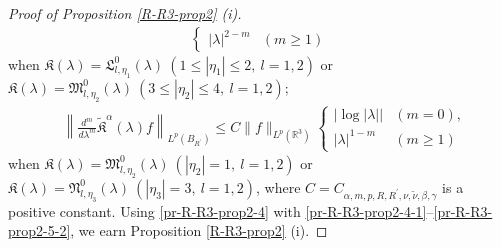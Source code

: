 \documentclass[dvipdfmx,12pt]{article}
\begin{document}
\begin{proof}[Proof of Proposition \ref{R-R3-prop2} {\rm (i)}]
\begin{align}
\begin{cases}
|\lambda|^{2-m} &(m\ge1)
\end{cases}  
\label{pr-R-R3-prop2-5-1} 
\end{align}
when $\mathfrak{K}(\lambda)=\mathfrak{L}_{l,\eta_1}^0(\lambda)~(1\le|\eta_1|\le2,~l=1,2)$ or $\mathfrak{K}(\lambda)= \mathfrak{M}_{l,\eta_2}^0(\lambda)~(3\le |\eta_2|\le 4,~l=1,2)$;
\begin{align}
&\left\|\frac{d^m }{d\lambda^m}\widetilde{\mathfrak{K}}^\alpha(\lambda)f \right\|_{L^p(B_{R^\prime})}
\leq C\|f\|_{L^p(\mathbb{R}^3)} 
\begin{cases}
\left|\log |\lambda|\right| & (m=0), \\
|\lambda|^{1-m} &(m\ge1)
\end{cases}  
\label{pr-R-R3-prop2-5-2} 
\end{align} 
when $\mathfrak{K}(\lambda)=\mathfrak{M}_{l,\eta_2}^0(\lambda)~(|\eta_2|=1,~l=1,2)$ or $\mathfrak{K}(\lambda)= \mathfrak{N}_{l,\eta_3}^0(\lambda)~(|\eta_3|= 3,~l=1,2)$, 
where $C=C_{\alpha,m,p,R,R^\prime,\nu,\tilde{\nu},\beta,\gamma}$ is a positive constant.  Using \eqref{pr-R-R3-prop2-4} with \eqref{pr-R-R3-prop2-4-1}--\eqref{pr-R-R3-prop2-5-2}, we earn Proposition \ref{R-R3-prop2} (i). 


\end{proof}
\end{document}
